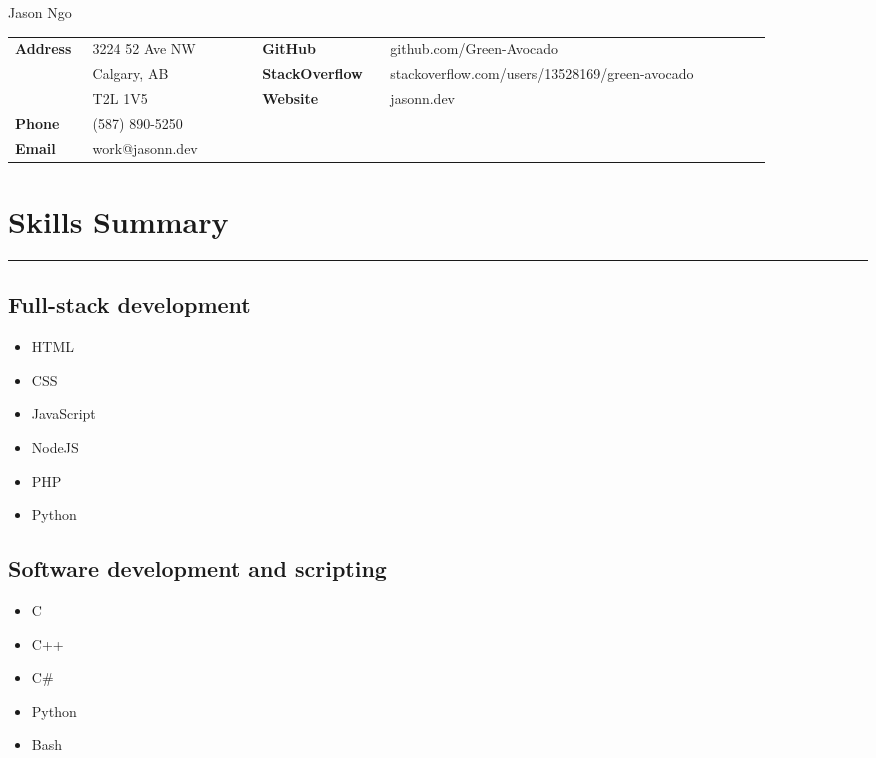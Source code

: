 \documentclass[letterpaper]{article}
\newcommand{\horizontalLine}{%
    \rule{\linewidth}{0.4pt}
    \vspace{1ex}
}
\begin{document}
    \begin{center}
        \Large
        Jason Ngo
    \end{center}

    {\small%
        \renewcommand{\arraystretch}{1.5}
        \begin{tabular}{p{0.08\linewidth} p{0.2\linewidth} p{0.15\linewidth} p{0.45\linewidth}}
            \textbf{Address} & 3224 52 Ave NW & \textbf{GitHub} & github.com/Green-Avocado \\
            & Calgary, AB & \textbf{StackOverflow} & stackoverflow.com/users/13528169/green-avocado \\
            & T2L 1V5 & \textbf{Website} & jasonn.dev \\
            \textbf{Phone} & (587) 890-5250 \\
            \textbf{Email} & work@jasonn.dev \\
        \end{tabular}
    }

    \section*{Skills Summary}

        \horizontalLine

        \subsection*{Full-stack development}

        \begin{itemize}[itemsep = 0pt]
            \item HTML
            \item CSS
            \item JavaScript
            \item NodeJS
            \item PHP
            \item Python
        \end{itemize}

        \subsection*{Software development and scripting}

        \begin{itemize}[itemsep = 0pt]
            \item C
            \item C++
            \item C\#
            \item Python
            \item Bash
        \end{itemize}
\end{document}
